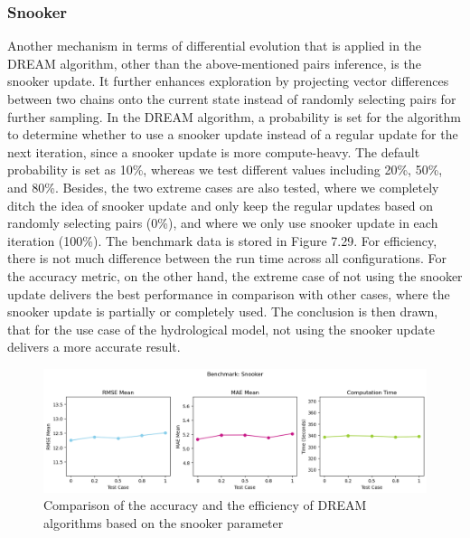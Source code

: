 \subsubsection{Snooker}
Another mechanism in terms of differential evolution that is applied in the DREAM algorithm, other than the above-mentioned pairs inference, is the snooker update. It further enhances exploration by projecting vector differences between two chains onto the current state instead of randomly selecting pairs for further sampling. In the DREAM algorithm, a probability is set for the algorithm to determine whether to use a snooker update instead of a regular update for the next iteration, since a snooker update is more compute-heavy. The default probability is set as 10\%, whereas we test different values including 20\%, 50\%, and 80\%. Besides, the two extreme cases are also tested, where we completely ditch the idea of snooker update and only keep the regular updates based on randomly selecting pairs (0\%), and where we only use snooker update in each iteration (100\%). The benchmark data is stored in Figure 7.29. For efficiency, there is not much difference between the run time across all configurations. For the accuracy metric, on the other hand, the extreme case of not using the snooker update delivers the best performance in comparison with other cases, where the snooker update is partially or completely used. The conclusion is then drawn, that for the use case of the hydrological model, not using the snooker update delivers a more accurate result.
\begin{figure}[H]
    \centering
    \includegraphics[width=1\textwidth]{figures/dream/snooker.png}
    \captionsetup{width=.8\textwidth}
    \caption{Comparison of the accuracy and the efficiency of DREAM algorithms based on the snooker parameter}
    \label{fig:enter-label}
\end{figure}

